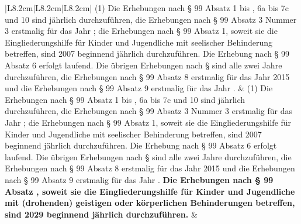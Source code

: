 \documentclass[10pt,a4paper,landscape]{article}
\begin{document}
\begin{longtable}{|L{8.2cm}|L{8.2cm}|L{8.2cm}|}
(1) Die Erhebungen nach \S{} 99 Absatz 1 bis  , 6a bis 7c und 10 sind jährlich  \newline durchzuführen, die Erhebungen nach \S{} 99  \newline Absatz 3 Nummer 3 erstmalig für das Jahr  ; die Erhebungen nach \S{} 99 Absatz 1,  \newline soweit sie die Eingliederungshilfe für  \newline Kinder und Jugendliche mit seelischer  \newline Behinderung betreffen, sind 2007  \newline beginnend jährlich durchzuführen. Die  \newline Erhebung nach \S{} 99 Absatz 6 erfolgt  \newline laufend. Die übrigen Erhebungen nach \S{}   sind alle zwei Jahre durchzuführen, die  \newline Erhebungen nach \S{} 99 Absatz 8 erstmalig  \newline für das Jahr 2015 und die Erhebungen  \newline nach \S{} 99 Absatz 9 erstmalig für das Jahr  . & (1) Die Erhebungen nach \S{} 99 Absatz 1 bis  , 6a bis 7c und 10 sind jährlich  \newline durchzuführen, die Erhebungen nach \S{} 99  \newline Absatz 3 Nummer 3 erstmalig für das Jahr  ; die Erhebungen nach \S{} 99 Absatz 1,  \newline soweit sie die Eingliederungshilfe für  \newline Kinder und Jugendliche mit seelischer  \newline Behinderung betreffen, sind 2007  \newline beginnend jährlich durchzuführen. Die  \newline Erhebung nach \S{} 99 Absatz 6 erfolgt  \newline laufend. Die übrigen Erhebungen nach \S{}   sind alle zwei Jahre durchzuführen, die  \newline Erhebungen nach \S{} 99 Absatz 8 erstmalig  \newline für das Jahr 2015 und die Erhebungen  \newline nach \S{} 99 Absatz 9 erstmalig für das Jahr  . \textbf{\textcolor{diffred}{Die Erhebungen nach \S{} 99 Absatz  , soweit sie die Eingliederungshilfe für  \newline Kinder und Jugendliche mit (drohenden)  \newline geistigen oder körperlichen  \newline Behinderungen betreffen, sind 2029  \newline beginnend jährlich durchzuführen.}} &  \\

\end{longtable}
\end{document}
